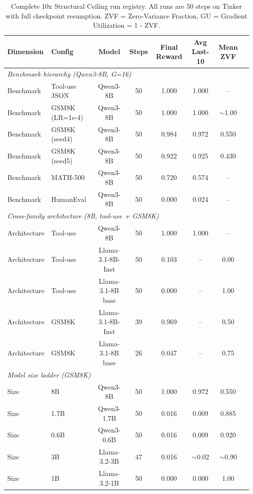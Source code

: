 \documentclass{article}
\begin{document}
\begin{table}[htbp]
    \centering
    \footnotesize
    \caption{Complete 10x Structural Ceiling run registry. All runs are 50 steps on Tinker with full checkpoint resumption. ZVF = Zero-Variance Fraction, GU = Gradient Utilization = 1 - ZVF.}
    \begin{tabular}{llcccccc}
        \toprule
        Dimension & Config & Model & Steps & Final Reward & Avg Last-10 & Mean ZVF \\
        \midrule
        \multicolumn{7}{l}{\emph{Benchmark hierarchy (Qwen3-8B, G=16)}} \\
        Benchmark & Tool-use JSON & Qwen3-8B & 50 & 1.000 & 1.000 & -- \\
        Benchmark & GSM8K (LR=1e-4) & Qwen3-8B & 50 & 1.000 & 1.000 & $\sim$1.00 \\
        Benchmark & GSM8K (seed4) & Qwen3-8B & 50 & 0.984 & 0.972 & 0.550 \\
        Benchmark & GSM8K (seed5) & Qwen3-8B & 50 & 0.922 & 0.925 & 0.430 \\
        Benchmark & MATH-500 & Qwen3-8B & 50 & 0.720 & 0.574 & -- \\
        Benchmark & HumanEval & Qwen3-8B & 50 & 0.000 & 0.024 & -- \\
        \midrule
        \multicolumn{7}{l}{\emph{Cross-family architecture (8B, tool-use + GSM8K)}} \\
        Architecture & Tool-use & Qwen3-8B & 50 & 1.000 & 1.000 & -- \\
        Architecture & Tool-use & Llama-3.1-8B-Inst & 50 & 0.103 & -- & 0.00 \\
        Architecture & Tool-use & Llama-3.1-8B base & 50 & 0.000 & -- & 1.00 \\
        Architecture & GSM8K & Llama-3.1-8B-Inst & 39 & 0.969 & -- & 0.50 \\
        Architecture & GSM8K & Llama-3.1-8B base & 26 & 0.047 & -- & 0.75 \\
        \midrule
        \multicolumn{7}{l}{\emph{Model size ladder (GSM8K)}} \\
        Size & 8B & Qwen3-8B & 50 & 1.000 & 0.972 & 0.550 \\
        Size & 1.7B & Qwen3-1.7B & 50 & 0.016 & 0.009 & 0.885 \\
        Size & 0.6B & Qwen3-0.6B & 50 & 0.016 & 0.009 & 0.920 \\
        Size & 3B & Llama-3.2-3B & 47 & 0.016 & $\sim$0.02 & $\sim$0.90 \\
        Size & 1B & Llama-3.2-1B & 50 & 0.000 & 0.000 & 1.00 \\

\end{tabular}
\end{table}
\end{document}
